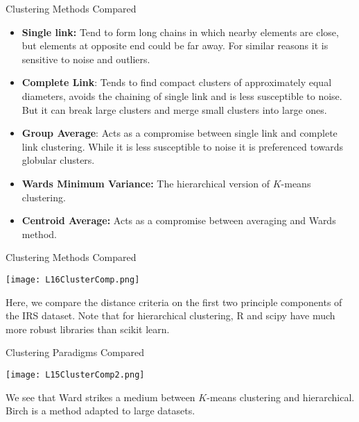 \documentclass[10pt, table, dvipsnames,xcdraw, handout]{beamer}
\begin{document}
\begin{frame}[fragile]{Clustering Methods Compared}
\begin{itemize}
\item[] \textbf{Single link:} Tend to form long chains in which nearby elements are close, but elements at opposite end could be far away. For similar reasons it is sensitive to noise and outliers.  \pause
\item[] \textbf{Complete Link}: Tends to find compact clusters of approximately equal diameters, avoids the chaining of single link and is less susceptible to noise. But it can break large clusters and merge small clusters into large ones. \pause
\item[] \textbf{Group Average}: Acts as a compromise between single link and complete link clustering. While it is less susceptible to noise it is preferenced towards globular clusters. \pause
\item[] \textbf{Wards Minimum Variance:} The hierarchical version of $K$-means clustering. \pause
\item[] \textbf{Centroid Average:} Acts as a compromise between averaging and Wards method. 
\end{itemize}
\end{frame}




\begin{frame}[fragile]{Clustering Methods Compared}
  \begin{minipage}[t][0.5\textheight][t]{\textwidth}
	\centering \texttt{[image: L16ClusterComp.png]} 
  \end{minipage}
  \vfill
\begin{minipage}[t][0.5\textheight][t]{\textwidth}
Here, we compare the distance criteria on the first two principle components of the IRS dataset. Note that for hierarchical clustering, R and scipy have much more robust libraries than scikit learn. 
\end{minipage}
\end{frame}


\begin{frame}[fragile]{Clustering Paradigms Compared}
  \begin{minipage}[t][0.5\textheight][t]{\textwidth}
	\centering \texttt{[image: L15ClusterComp2.png]} 
  \end{minipage}
  \vfill
\begin{minipage}[t][0.5\textheight][t]{\textwidth}
We see that Ward strikes a medium between $K$-means clustering and hierarchical. Birch is a method adapted to large datasets.
\end{minipage}
\end{frame}
\end{document}
